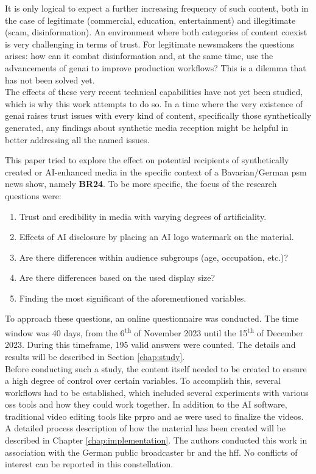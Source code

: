 \documentclass[
  a4paper,  %
  twoside,  %
  bibliography=totoc,
  headsepline,
  cleardoublepage=empty,
  parskip=half,
  draft=false
]{scrbook}
\begin{document}
It is only logical to expect a further increasing frequency of such content, both in the case of legitimate (commercial, education, entertainment) and illegitimate (scam, disinformation). An environment where both categories of content coexist is very challenging in terms of trust. For legitimate newsmakers the questions arises: how can it combat disinformation and, at the same time, use the advancements of \gls{genai} to improve production workflows? This is a dilemma that has not been solved yet. \\
The effects of these very recent technical capabilities have not yet been studied, which is why this work attempts to do so. In a time where the very existence of \gls{genai} raises trust issues with every kind of content, specifically those synthetically generated, any findings about synthetic media reception might be helpful in better addressing all the named issues.

This paper tried to explore the effect on potential recipients of synthetically created or AI-enhanced media in the specific context of a Bavarian/German \gls{psm} news show, namely \textbf{BR24}. To be more specific, the focus of the research questions were: 

\begin{enumerate}
  \item Trust and credibility in media with varying degrees of artificiality.
  \item Effects of AI disclosure by placing an AI logo watermark on the material.
  \item Are there differences within audience subgroups (age, occupation, etc.)?
  \item Are there differences based on the used display size?
  \item Finding the most significant of the aforementioned variables.
\end{enumerate}

To approach these questions, an online questionnaire was conducted. The time window was 40 days, from the 6\textsuperscript{th} of November 2023 until the 15\textsuperscript{th} of December 2023. During this timeframe, 195 valid answers were counted. The details and results will be described in Section \ref{chap:study}. \\
Before conducting such a study, the content itself needed to be created to ensure a high degree of control over certain variables. To accomplish this, several workflows had to be established, which included several experiments with various \gls{oss} tools and how they could work together. In addition to the AI software, traditional video editing tools like \gls{prpro} and \gls{ae} were used to finalize the videos. A detailed process description of how the material has been created will be described in Chapter \ref{chap:implementation}. The authors conducted this work in association with the German public broadcaster \gls{br} and the \gls{hff}. No conflicts of interest can be reported in this constellation.
\end{document}
